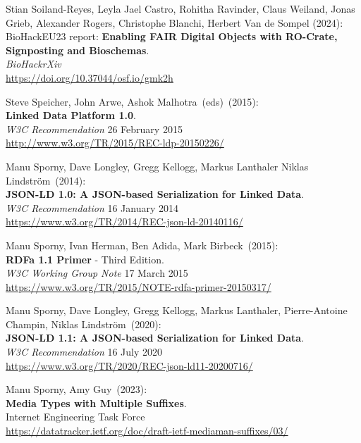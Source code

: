 \begin{thebibliography}{9}
Stian Soiland-Reyes, Leyla Jael Castro, Rohitha Ravinder, Claus Weiland, Jonas Grieb, Alexander Rogers, Christophe Blanchi, Herbert Van de Sompel (2024): \\
BioHackEU23 report: \textbf{Enabling FAIR Digital Objects with RO-Crate, Signposting and Bioschemas}. \\
\emph{BioHackrXiv} \\
\url{https://doi.org/10.37044/osf.io/gmk2h}

Steve Speicher, John Arwe, Ashok Malhotra~(eds)~(2015): \\
\textbf{Linked Data Platform 1.0}.\\ 
\emph{W3C Recommendation} 26 February 2015\\
\url{http://www.w3.org/TR/2015/REC-ldp-20150226/}

Manu Sporny, Dave Longley,  Gregg Kellogg,  Markus Lanthaler Niklas Lindström~(2014): \\
\textbf{JSON-LD 1.0: A JSON-based Serialization for Linked Data}.\\
\emph{W3C Recommendation} 16 January 2014\\
\url{https://www.w3.org/TR/2014/REC-json-ld-20140116/}

Manu Sporny, Ivan Herman, Ben Adida, Mark Birbeck~(2015): \\
\textbf{RDFa 1.1 Primer} - Third Edition. \\
\emph{W3C Working Group Note} 17 March 2015 \\
\url{https://www.w3.org/TR/2015/NOTE-rdfa-primer-20150317/}

Manu Sporny, Dave Longley, Gregg Kellogg, Markus Lanthaler, Pierre-Antoine Champin, Niklas Lindström~(2020): \\
\textbf{JSON-LD 1.1: A JSON-based Serialization for Linked Data}.\\
\emph{W3C Recommendation} 16 July 2020\\
\url{https://www.w3.org/TR/2020/REC-json-ld11-20200716/}

Manu Sporny, Amy Guy~(2023): \\
\textbf{{Media Types with Multiple Suffixes}}.\\
Internet Engineering Task Force\\
\url{https://datatracker.ietf.org/doc/draft-ietf-mediaman-suffixes/03/}
 

\end{thebibliography}
